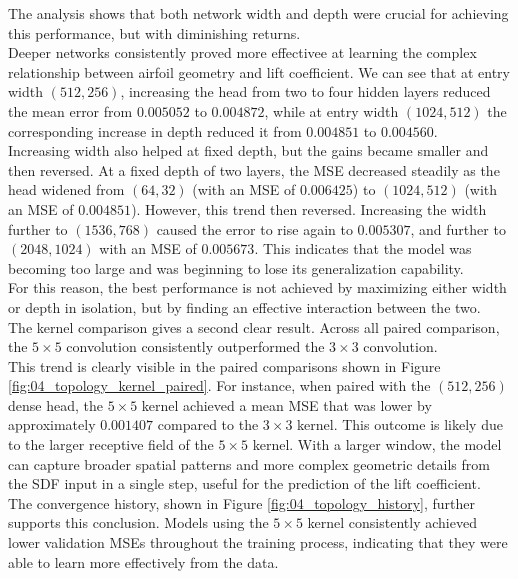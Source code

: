 The analysis shows that both network width and depth were crucial for achieving this performance, but with diminishing returns.\\
Deeper networks consistently proved more effectivee at learning the complex relationship between airfoil geometry and lift coefficient. We can see that at entry width $(512,256)$, increasing the head from two to four hidden layers reduced the mean error from $0.005052$ to $0.004872$, while at entry width $(1024,512)$ the corresponding increase in depth reduced it from $0.004851$ to $0.004560$.\\
Increasing width also helped at fixed depth, but the gains became smaller and then reversed. At a fixed depth of two layers, the MSE decreased steadily as the head widened from $(64,32)$ (with an MSE of $0.006425$) to $(1024,512)$ (with an MSE of $0.004851$). However, this trend then reversed. Increasing the width further to $(1536,768)$ caused the error to rise again to $0.005307$, and further to $(2048,1024)$ with an MSE of $0.005673$. This indicates that the model was becoming too large and was beginning to lose its generalization capability.\\
For this reason, the best performance is not achieved by maximizing either width or depth in isolation, but by finding an effective interaction between the two.\\

The kernel comparison gives a second clear result. Across all paired comparison, the $5\times5$ convolution consistently outperformed the $3\times3$ convolution.\\
This trend is clearly visible in the paired comparisons shown in Figure \ref{fig:04_topology_kernel_paired}. For instance, when paired with the $(512,256)$ dense head, the $5\times5$ kernel achieved a mean MSE that was lower by approximately $0.001407$ compared to the $3\times3$ kernel. This outcome is likely due to the larger receptive field of the $5\times5$ kernel. With a larger window, the model can capture broader spatial patterns and more complex geometric details from the SDF input in a single step, useful for the prediction of the lift coefficient.\\
The convergence history, shown in Figure \ref{fig:04_topology_history}, further supports this conclusion. Models using the $5\times5$ kernel consistently achieved lower validation MSEs throughout the training process, indicating that they were able to learn more effectively from the data.\\

